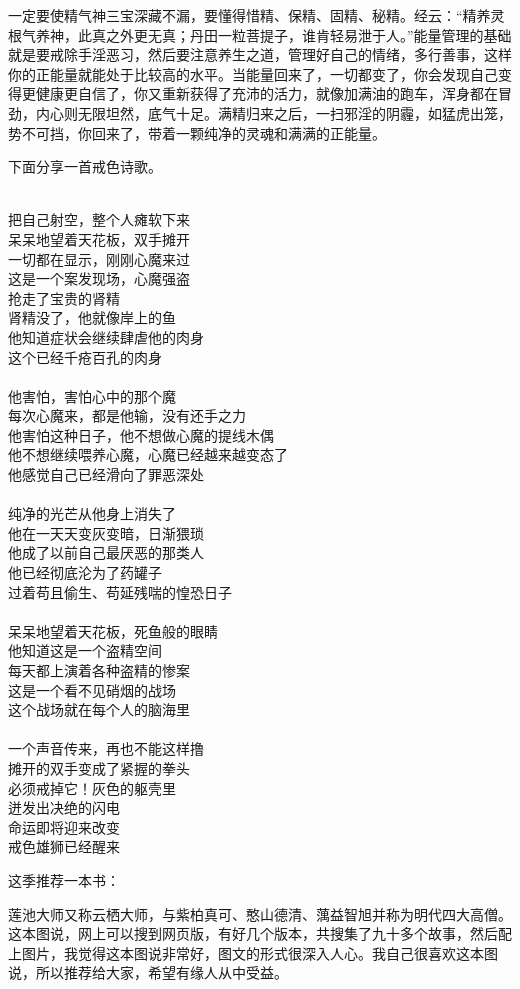 一定要使精气神三宝深藏不漏，要懂得惜精、保精、固精、秘精。经云：“精养灵根气养神，此真之外更无真；丹田一粒菩提子，谁肯轻易泄于人。”能量管理的基础就是要戒除手淫恶习，然后要注意养生之道，管理好自己的情绪，多行善事，这样你的正能量就能处于比较高的水平。当能量回来了，一切都变了，你会发现自己变得更健康更自信了，你又重新获得了充沛的活力，就像加满油的跑车，浑身都在冒劲，内心则无限坦然，底气十足。满精归来之后，一扫邪淫的阴霾，如猛虎出笼，势不可挡，你回来了，带着一颗纯净的灵魂和满满的正能量。

下面分享一首戒色诗歌。

\begin{poem}[盗精空间]
    \begin{multicols}{2}
        \centering~\\
        把自己射空，整个人瘫软下来 \\ 呆呆地望着天花板，双手摊开 \\ 一切都在显示，刚刚心魔来过 \\ 这是一个案发现场，心魔强盗 \\ 抢走了宝贵的肾精 \\ 肾精没了，他就像岸上的鱼 \\ 他知道症状会继续肆虐他的肉身 \\ 这个已经千疮百孔的肉身\\~\\
        他害怕，害怕心中的那个魔 \\ 每次心魔来，都是他输，没有还手之力 \\ 他害怕这种日子，他不想做心魔的提线木偶 \\ 他不想继续喂养心魔，心魔已经越来越变态了 \\ 他感觉自己已经滑向了罪恶深处\\~\\
        纯净的光芒从他身上消失了 \\ 他在一天天变灰变暗，日渐猥琐 \\ 他成了以前自己最厌恶的那类人 \\ 他已经彻底沦为了药罐子 \\ 过着苟且偷生、苟延残喘的惶恐日子\\~\\
        呆呆地望着天花板，死鱼般的眼睛 \\ 他知道这是一个盗精空间 \\ 每天都上演着各种盗精的惨案 \\ 这是一个看不见硝烟的战场 \\ 这个战场就在每个人的脑海里\\~\\
        一个声音传来，再也不能这样撸 \\ 摊开的双手变成了紧握的拳头 \\ 必须戒掉它！灰色的躯壳里 \\ 迸发出决绝的闪电 \\ 命运即将迎来改变 \\ 戒色雄狮已经醒来
    \end{multicols}
\end{poem}

这季推荐一本书：

\begin{book}[《莲池大师戒杀放生文图说》]
    莲池大师又称云栖大师，与紫柏真可、憨山德清、蕅益智旭并称为明代四大高僧。这本图说，网上可以搜到网页版，有好几个版本，共搜集了九十多个故事，然后配上图片，我觉得这本图说非常好，图文的形式很深入人心。我自己很喜欢这本图说，所以推荐给大家，希望有缘人从中受益。
\end{book}
